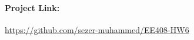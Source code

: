 \documentclass[11pt]{article}
\begin{document}

\maketitle %

\thispagestyle{empty} %

\newpage

\paragraph*{Project Link:} \url{https://github.com/sezer-muhammed/EE408-HW6}
\end{document}
